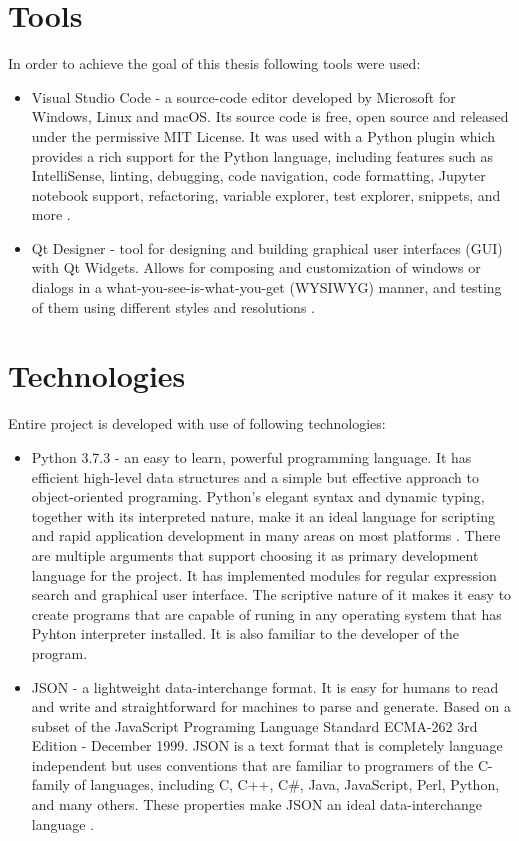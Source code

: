 \documentclass[a4paper,twoside,12pt]{book}
\begin{document}
\section{Tools}
In order to achieve the goal of this thesis following tools were used:
\begin{itemize}
   \item Visual Studio Code - a source-code editor developed by Microsoft for Windows, Linux and macOS. Its source code is free, open source and 
   released under the permissive MIT License. It was used with a Python plugin which provides a rich support for the Python language, including 
   features such as IntelliSense, linting, debugging, code navigation, code formatting, Jupyter notebook support, refactoring, variable explorer, 
   test explorer, snippets, and more \cite{bib:internetVSCLicence}\cite{bib:internetVSC}.
   \item Qt Designer - tool for designing and building graphical user interfaces (GUI) with Qt Widgets. Allows for composing and customization 
   of windows or dialogs in a what-you-see-is-what-you-get (WYSIWYG) manner, and testing of them using different styles and resolutions \cite{bib:internetQt}.
\end{itemize} 
\section{Technologies}
Entire project is developed with use of following technologies:
\begin{itemize}
   \item Python 3.7.3 - an easy to learn, powerful programming language. It has efficient high-level data structures 
   and a simple but effective approach to object-oriented programing. Python’s elegant syntax and dynamic typing, together with its interpreted nature, make it 
   an ideal language for scripting and rapid application development in many areas on most platforms \cite{bib:bookPython}. There are multiple arguments that support
   choosing it as primary development language for the project. It has implemented modules for regular expression search and graphical user interface.
   The scriptive nature of it makes it easy to create programs that are capable of runing in any operating system that has Pyhton interpreter installed.
   It is also familiar to the developer of the program.
   \item JSON - a lightweight data-interchange format. It is easy for humans to read and write and straightforward for machines to parse and generate. Based on a
   subset of the JavaScript Programing Language Standard ECMA-262 3rd Edition - December 1999. JSON is a text format that is completely language independent but
   uses conventions that are familiar to programers of the C-family of languages, including C, C++, C\#, Java, JavaScript, Perl, Python, and many others. These
   properties make JSON an ideal data-interchange language \cite{bib:internetJSON}.
\end{itemize}
\end{document}
